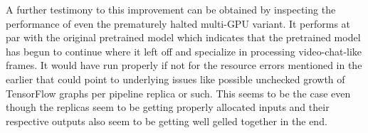     
    
    
    

A further testimony to this improvement can be obtained by inspecting the performance of even the prematurely halted multi-GPU variant. It performs at par with the original pretrained model which indicates that the pretrained model has begun to continue where it left off and specialize in processing video-chat-like frames. It would have run properly if not for the resource errors mentioned in the earlier that could point to underlying issues like possible unchecked growth of TensorFlow graphs per pipeline replica or such. This seems to be the case even though the replicas seem to be getting properly allocated inputs and their respective outputs also seem to be getting well gelled together in the end.